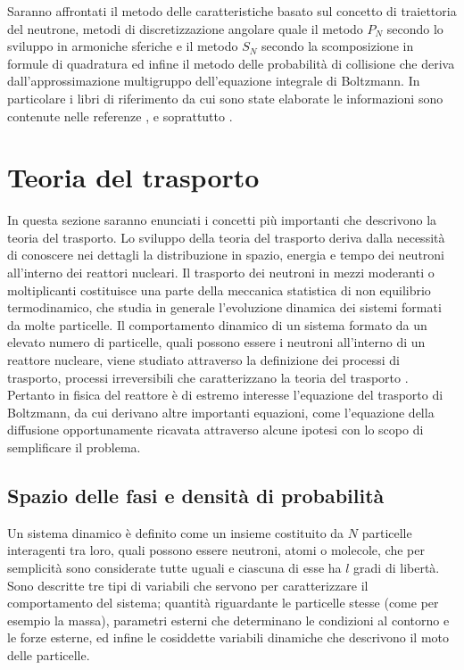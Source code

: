 Saranno affrontati il metodo delle caratteristiche basato sul 
concetto di traiettoria del neutrone, metodi di discretizzazione angolare quale 
il metodo $P_N$ secondo lo sviluppo in armoniche sferiche e il metodo $S_N$ 
secondo la scomposizione in formule di quadratura ed infine il metodo delle 
probabilità di collisione che deriva dall'approssimazione multigruppo 
dell'equazione integrale di Boltzmann.
In particolare i libri di riferimento da cui sono state elaborate le informazioni 
sono contenute nelle referenze \cite{lamarsh}, \cite{stacey} e soprattutto 
\cite{hebertreact}. 

\section{Teoria del trasporto}
In questa sezione saranno enunciati i concetti più importanti che descrivono la 
teoria del trasporto. Lo sviluppo della teoria del trasporto deriva dalla 
necessità di conoscere nei dettagli la distribuzione in spazio, energia e tempo 
dei neutroni all'interno dei reattori nucleari. Il trasporto dei neutroni in 
mezzi moderanti o moltiplicanti costituisce una parte della meccanica 
statistica di non equilibrio termodinamico, che studia in generale l'evoluzione 
dinamica dei sistemi formati da molte particelle. Il comportamento dinamico di 
un sistema formato da un elevato numero di particelle, quali possono essere i 
neutroni all'interno di un reattore nucleare, viene studiato attraverso la 
definizione dei processi di trasporto, processi irreversibili che 
caratterizzano la teoria del trasporto \cite{molin}.
Pertanto in fisica del reattore è di estremo interesse l'equazione del trasporto 
di Boltzmann, da cui derivano altre importanti equazioni, come l'equazione della 
diffusione opportunamente ricavata attraverso alcune ipotesi con lo scopo di 
semplificare il problema.


\subsection{Spazio delle fasi e densità di probabilità}
Un sistema dinamico è definito come un insieme costituito da $N$ particelle 
interagenti tra loro, quali possono essere neutroni, atomi o molecole, che per 
semplicità sono considerate tutte uguali e ciascuna di esse ha $l$ gradi 
di libertà. 
Sono descritte tre tipi di variabili che servono per caratterizzare il 
comportamento del sistema; quantità riguardante le particelle stesse (come per 
esempio la massa), parametri esterni che determinano le condizioni al 
contorno e le forze esterne, ed infine le cosiddette variabili dinamiche che 
descrivono il moto delle particelle.

